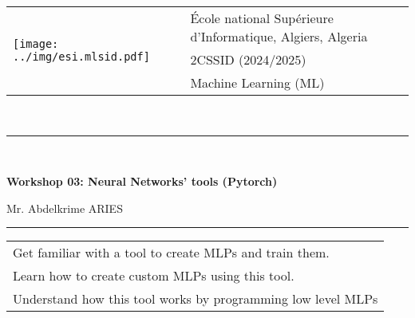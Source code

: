 \documentclass[11pt, a4paper]{article}
\begin{document}
	
	\begin{tabular}{ll}
		\multirow{3}{*}{\texttt{[image: ../img/esi.mlsid.pdf]}} 
		& \'Ecole national Supérieure d'Informatique, Algiers, Algeria\\
		& 2CSSID (2024/2025)\\
		& Machine Learning (ML)
	\end{tabular}\\[.25cm]
	\noindent\rule{\textwidth}{1pt}\\[-0.5cm]
	\begin{center}
		{\LARGE \textbf{Workshop 03: Neural Networks' tools (Pytorch)}}
		\begin{flushright}
			Mr. Abdelkrime ARIES
		\end{flushright}
	\end{center}\vspace{-.25cm}
	\noindent\rule{\textwidth}{1pt}
	
	\begin{center}
		\begin{tabular}{|p{}|}
		\hline
		Get familiar with a tool to create MLPs and train them.  \\
		Learn how to create custom MLPs using this tool. \\
		Understand how this tool works by programming low level MLPs \\
		\hline
	\end{tabular}
	\end{center}

%
\end{document}
